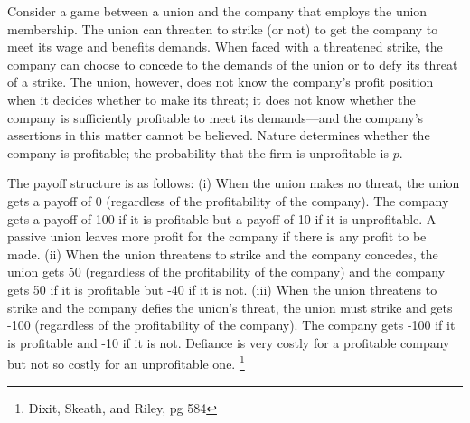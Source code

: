 \documentclass[addpoints ]{exam}
\begin{document}
\begin{questions}
  
\newpage


\question
Consider a game between a union and the company that employs the union membership. The union can threaten to strike (or not) to get the company to meet its wage and benefits demands. When faced with a threatened strike, the company can choose to concede to the demands of the union or to defy its threat of a strike. The union, however, does not know the company’s profit position when it decides whether to make its threat; it does not know whether the company is sufficiently profitable to meet its demands—and the company’s assertions in this matter cannot be believed. Nature determines whether the company is profitable; the probability that the firm is unprofitable is $p$.

The payoff structure is as follows: (i) When the union makes no threat, the union gets a payoff of 0 (regardless of the profitability of the company). The company gets a payoff of 100 if it is profitable but a payoff of 10 if it is unprofitable. A passive union leaves more profit for the company if there is any profit to be made. (ii) When the union threatens to strike and the company concedes, the union gets 50 (regardless of the profitability of the company) and the company gets 50 if it is profitable but -40 if it is not. (iii) When the union threatens to strike and the company defies the union’s threat, the union must strike and gets -100 (regardless of the profitability of the company). The company gets -100 if it is profitable and -10 if it is not. Defiance is very costly for a profitable company but not so costly for an unprofitable one.
\footnote{Dixit, Skeath, and Riley, pg 584}


\end{questions}
\end{document}
